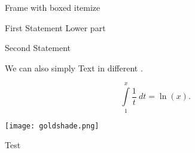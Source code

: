 \begin{frame}[t]{Frame with boxed itemize}
  \begin{tcbitemize}[
      raster equal height=rows,
      raster equal skip=1mm,
      TUMBox=TUMBlue]

    \tcbitem[title=One]
      First Statement
      \tcblower
      Lower part

    \tcbitem[title=Two]
      Second Statement

    \tcbitem[title=Three]
      We can also simply  Text
      in different .

    \tcbitem[title=Four]
      \begin{equation*}
        \int\limits_{1}^{x} \frac{1}{t}~dt = \ln(x).
      \end{equation*}

    \tcbitem[title=Five]
      \texttt{[image: goldshade.png]}

    \tcbitem[title=Six]
      Test
  \end{tcbitemize}
\end{frame}



